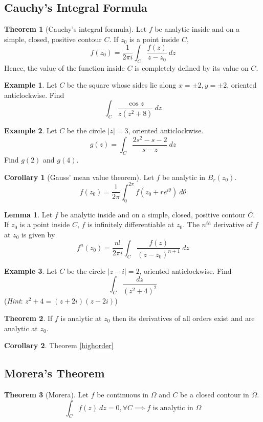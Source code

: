 \documentclass[10pt, a4paper]{extarticle}
\theoremstyle{definition}
\newtheorem{thm}{Theorem}
\newtheorem{lem}{Lemma}[thm]
\newtheorem{cor}{Corollary}[thm]
\newtheorem{eg}{Example}
\begin{document}
\subsection{Cauchy's Integral Formula}
\begin{thm}[Cauchy's integral formula]
	Let $f$ be analytic inside and on a simple, closed, positive contour $C$. If $z_0$ is a point inside $C$,
	\[f(z_0)=\frac{1}{2\pi i}\int_C\frac{f(z)}{z-z_0}\ dz\]
	Hence, the value of the function inside $C$ is completely defined by its value on $C$.
\end{thm}
\begin{eg}
	Let $C$ be the square whose sides lie along $x=\pm2,y=\pm2$, oriented anticlockwise. Find
	\[\int_C\frac{\cos z}{z(z^2+8)}\ dz\]
\end{eg}
\begin{eg}
	Let $C$ be the circle $|z|=3$, oriented anticlockwise.
	\[g(z)=\int_C\frac{2s^2-s-2}{s-z}\ dz\]
	Find $g(2)$ and $g(4)$.
\end{eg}
\begin{cor}[Gauss' mean value theorem]
	Let $f$ be analytic in $B_r(z_0)$.
	\[f(z_0)=\frac{1}{2\pi}\int_{0}^{2\pi}f(z_0+re^{i\theta})\ d\theta\]
\end{cor}
\begin{lem}
	Let $f$ be analytic inside and on a simple, closed, positive contour $C$. If $z_0$ is a point inside $C$, $f$ is infinitely differentiable at $z_0$. The $n^{th}$ derivative of $f$ at $z_0$ is given by
	\[f^{n}(z_0)=\frac{n!}{2\pi i}\int_C\frac{f(z)}{(z-z_0)^{n+1}}\ dz\tag*{($n=1,2,\cdots$)}\]
\end{lem}
\begin{eg}
	Let $C$ be the circle $|z-i|=2$, oriented anticlockwise. Find
	\[\int_C \frac{dz}{(z^2+4)^2}\]
	(\textit{Hint}: $z^2+4=(z+2i)(z-2i)$)
\end{eg}
\begin{thm}
	If $f$ is analytic at $z_0$ then its derivatives of all orders exist and are analytic at $z_0$.
\end{thm}
\begin{cor}
	Theorem \ref{highorder}
\end{cor}

\subsection{Morera's Theorem}
\begin{thm}[Morera]
	Let $f$ be continuous in $\Omega$ and $C$ be a closed contour in $\Omega$.
	\[\int_Cf(z)\ dz=0,\forall C\implies f \text{ is analytic in }\Omega\]
\end{thm}
\end{document}
